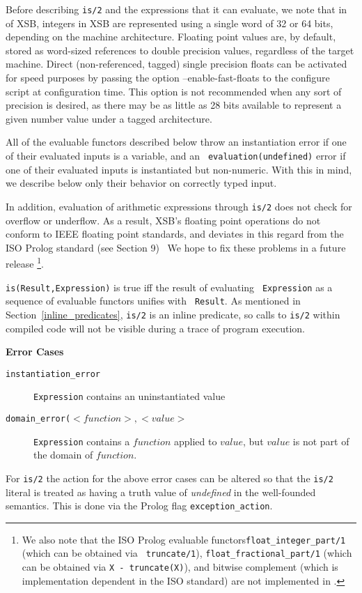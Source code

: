 Before describing {\tt is/2} and the expressions that it can evaluate,
we note that in \version{} of XSB, integers in XSB are represented
using a single word of 32 or 64 bits, depending on the machine
architecture. Floating point values are, by default, stored as
word-sized references to double precision values, regardless of the
target machine. Direct (non-referenced, tagged) single precision
floats can be activated for speed purposes by passing the option
--enable-fast-floats to the configure script at configuration time.
This option is not recommended when any sort of precision is desired,
as there may be as little as 28 bits available to represent a given
number value under a tagged architecture.  

All of the evaluable functors described below throw an instantiation
error if one of their evaluated inputs is a variable, and an {\tt
  evaluation(undefined)} error if one of their evaluated inputs is
instantiated but non-numeric.  With this in mind, we describe below
only their behavior on correctly typed input.

\compatability
In addition, evaluation of arithmetic expressions through {\tt is/2}
does not check for overflow or underflow.  As a result, XSB's floating
point operations do not conform to IEEE floating point standards, and
deviates in this regard from the ISO Prolog standard (see
\cite{ISO-Prolog} Section 9)~ We hope to fix these problems in a
future release \footnote{We also note that the ISO Prolog evaluable
  functors{\tt float\_integer\_part/1} (which can be obtained via {\tt
    truncate/1}), {\tt float\_fractional\_part/1} (which can be
  obtained via {\tt X - truncate(X)}), and bitwise complement (which
  is implementation dependent in the ISO standard) are not implemented
  in \version .}.

\begin{description}
{\tt is(Result,Expression)} is true iff the result of evaluating {\tt
Expression} as a sequence of evaluable functors unifies with {\tt
Result}.  As mentioned in Section~\ref{inline_predicates}, {\tt is/2}
is an inline predicate, so calls to {\tt is/2} within compiled code
will not be visible during a trace of program execution.

{\bf Error Cases}
    \begin{description}
    \item[{\tt instantiation\_error}]
	{\tt Expression} contains an uninstantiated value
    \item[{\tt domain\_error($<function>,<value>$}] {\tt Expression}
      contains a $function$ applied to $value$, but $value$ is not
      part of the domain of $function$.
    \end{description}

For {\tt is/2} the action for the above error cases can be altered so
that the {\tt is/2} literal is treated as having a truth value of {\em
  undefined} in the well-founded semantics.  This is done via the
Prolog flag {\tt exception\_action}.

\end{description}

